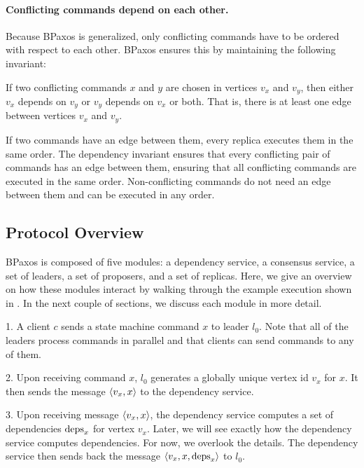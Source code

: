 {}

\paragraph{Conflicting commands depend on each other.}
Because BPaxos is generalized, only conflicting commands have to be ordered
with respect to each other. BPaxos ensures this by maintaining the following
invariant:
\begin{invariant}
  If two conflicting commands $x$ and $y$ are chosen in vertices $v_x$ and
  $v_y$, then either $v_x$ depends on $v_y$ or $v_y$ depends on $v_x$ or both.
  That is, there is at least one edge between vertices $v_x$ and $v_y$.
\end{invariant}
If two commands have an edge between them, every replica executes them in the
same order.  The dependency invariant ensures that every conflicting pair of
commands has an edge between them, ensuring that all conflicting commands are
executed in the same order. Non-conflicting commands do not need an edge
between them and can be executed in any order.

\subsection{Protocol Overview}
BPaxos is composed of five modules: a dependency service, a consensus service,
a set of leaders, a set of proposers, and a set of replicas. Here, we give an
overview on how these modules interact by walking through the example execution
shown in . In the next couple of sections, we discuss
each module in more detail.

1. A client $c$ sends a state machine command $x$ to leader $l_0$. Note that
all of the leaders process commands in parallel and that clients can send
commands to any of them.

2. Upon receiving command $x$, $l_0$ generates a globally unique vertex id
$v_x$ for $x$. It then sends the message $\langle v_x, x \rangle$ to the dependency
service.

3. Upon receiving message $\langle v_x, x \rangle$, the dependency service computes a set
of dependencies $\text{deps}_x$ for vertex $v_x$. Later, we will see exactly how the
dependency service computes dependencies. For now, we overlook the details. The
dependency service then sends back the message $\langle v_x, x, \text{deps}_x \rangle$ to
$l_0$.

